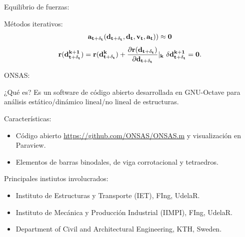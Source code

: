 \documentclass[
  aspectratio=169,
]{beamer}
\begin{document}
\begin{small}
\begin{frame}{Equilibrio de fuerzas:}{}
\begin{block}{Métodos iterativos:}
\begin{equation}
\begin{split}
			\bf{a}_{t+\delta_t}(d_{t+\delta_t},\bf{d_t},\bf{v_t},\bf{a_t}))
			\approx 0
		\end{split}
		\end{equation}
		\begin{equation}\label{Eq:MET:Residuo}
		\bf{r}(\bf{d}^{k+1}_{t+\delta_t})=\bf{r}(\bf{d}^k_{t+\delta_t}) +
		\frac{\partial  \bf{r}(\bf{d}_{t+\delta_t})}{\partial
			\bf{d}_{t+\delta_t}}|_k~\delta \bf{d}^{k+1}_{t+\delta_t}=0.
	\end{equation}
\end{block}
\end{frame}
\begin{frame}{ONSAS:}{}
	\begin{block}{¿Qué es?}
		Es un software de código abierto desarrollada en GNU-Octave para análisis estático/dinámico lineal/no lineal de estructuras. 
	\end{block}
	\begin{block}{Características:}
		\begin{itemize}
			\item Código abierto {\color{blue}\href{https://github.com/ONSAS/ONSAS.m/}{https://github.com/ONSAS/ONSAS.m}} y visualización en {\color{red} Paraview}.
			\item Elementos de barras binodales, de viga corrotacional y tetraedros.
		\end{itemize}
	\end{block}
	\begin{block}{Principales instiutos involucrados:}
		\begin{itemize}
			\item Instituto de Estructuras y Transporte (IET), FIng, UdelaR.
			\item Instituto de Mecánica y Producción Industrial (IIMPI), FIng, UdelaR.
			\item Department of Civil and Architectural Engineering, KTH, Sweden.
		\end{itemize}
	\end{block}
	

\end{frame}
\end{small}
\end{document}
